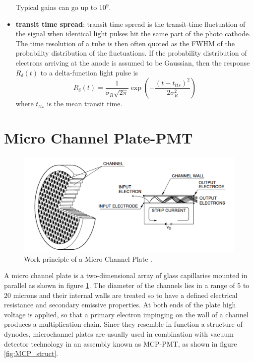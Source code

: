 \begin{itemize}
\begin{equation}
\end{equation}
Typical gains can go up to 10$^{9}$.
\item \textbf{transit time spread}: transit time spread is the transit-time fluctuation of the signal when identical light pulses hit the same part of the photo cathode. The time resolution of a tube is then often quoted as the FWHM of the probability distribution of the fluctuations.
If the probability distribution of electrons arriving at the anode is assumed to be Gaussian, then the response $R_{\delta}(t)$ to a delta-function light pulse is
\begin{equation}
R_{\delta}(t) = \frac{1}{\sigma _{R}\sqrt {2\pi}}\exp{\left( -\frac{(t-t_{tts})^2}{2\sigma _{R}^2}\right)}
\end{equation}
where $t_{tts}$ is the mean transit time.
\end{itemize}

\section{Micro Channel Plate-PMT}
\begin{figure}[htbp]
\begin{center}
\includegraphics[width=12cm]{../Pictures/Chapter_3/MCP_plate.png}
\end{center}
\caption[MCP principle]{Work principle of a Micro Channel Plate \cite{Hama2006}.}
\label{fig:MCP_schematics}
\end{figure}
A micro channel plate is a two-dimensional array of glass capillaries mounted in parallel as shown in figure \ref{fig:MCP_schematics}.
The diameter of the channels lies in a range of 5 to 20 microns and their internal walls are treated so to have a defined electrical resistance and secondary emissive properties.
At both ends of the plate high voltage is applied, so that a primary electron impinging on the wall of a channel produces a multiplication chain.
Since they resemble in function a structure of dynodes, microchannel plates are usually used in combination with vacuum detector technology in an assembly known as MCP-PMT, as shown in figure \ref{fig:MCP_struct}.

